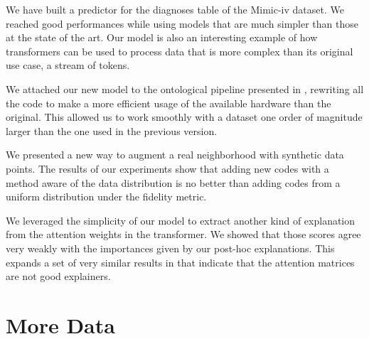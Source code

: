 \documentclass[]{marticle}
\begin{document}
We have built a predictor for the diagnoses table of the Mimic-iv dataset. We reached good
performances while using models that are much simpler than those at the state of the art. Our model
is also an interesting example of how transformers can be used to process data that is more complex
than its original use case, a stream of tokens.

We attached our new model to the ontological pipeline presented in \cite{panigutti-xai}, rewriting
all the code to make a more efficient usage of the available hardware than the original. This
allowed us to work smoothly with a dataset one order of magnitude larger than the one used in the
previous version.

We presented a new way to augment a real neighborhood with synthetic data points. The results of our
experiments show that adding new codes with a method aware of the data distribution is no better
than adding codes from a uniform distribution under the fidelity metric.

We leveraged the simplicity of our model to extract another kind of explanation from the attention
weights in the transformer. We showed that those scores agree very weakly with the importances given
by our post-hoc explanations. This expands a set of very similar results in
\cite{attention-not-explanation} that indicate that the attention matrices are not good explainers.

\clearpage
\appendix
\section{More Data}

\end{document}
